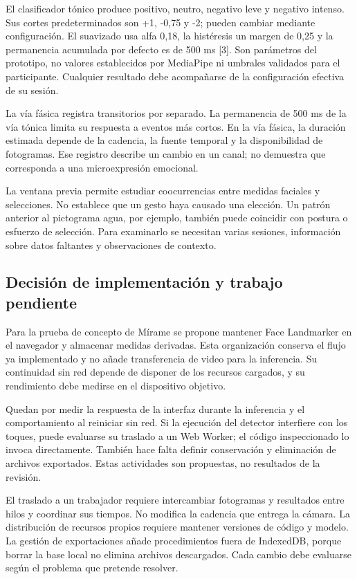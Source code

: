 \documentclass[conference,letterpaper]{IEEEtran}
\begin{document}
El clasificador tónico produce positivo, neutro, negativo leve y negativo intenso. Sus cortes predeterminados son +1, -0,75 y -2; pueden cambiar mediante configuración. El suavizado usa alfa 0,18, la histéresis un margen de 0,25 y la permanencia acumulada por defecto es de 500 ms [3]. Son parámetros del prototipo, no valores establecidos por MediaPipe ni umbrales validados para el participante. Cualquier resultado debe acompañarse de la configuración efectiva de su sesión.

La vía fásica registra transitorios por separado. La permanencia de 500 ms de la vía tónica limita su respuesta a eventos más cortos. En la vía fásica, la duración estimada depende de la cadencia, la fuente temporal y la disponibilidad de fotogramas. Ese registro describe un cambio en un canal; no demuestra que corresponda a una microexpresión emocional.

La ventana previa permite estudiar coocurrencias entre medidas faciales y selecciones. No establece que un gesto haya causado una elección. Un patrón anterior al pictograma agua, por ejemplo, también puede coincidir con postura o esfuerzo de selección. Para examinarlo se necesitan varias sesiones, información sobre datos faltantes y observaciones de contexto.


\subsection{Decisión de implementación y trabajo pendiente}
Para la prueba de concepto de Mírame se propone mantener Face Landmarker en el navegador y almacenar medidas derivadas. Esta organización conserva el flujo ya implementado y no añade transferencia de video para la inferencia. Su continuidad sin red depende de disponer de los recursos cargados, y su rendimiento debe medirse en el dispositivo objetivo.

Quedan por medir la respuesta de la interfaz durante la inferencia y el comportamiento al reiniciar sin red. Si la ejecución del detector interfiere con los toques, puede evaluarse su traslado a un Web Worker; el código inspeccionado lo invoca directamente. También hace falta definir conservación y eliminación de archivos exportados. Estas actividades son propuestas, no resultados de la revisión.

El traslado a un trabajador requiere intercambiar fotogramas y resultados entre hilos y coordinar sus tiempos. No modifica la cadencia que entrega la cámara. La distribución de recursos propios requiere mantener versiones de código y modelo. La gestión de exportaciones añade procedimientos fuera de IndexedDB, porque borrar la base local no elimina archivos descargados. Cada cambio debe evaluarse según el problema que pretende resolver.
\end{document}
